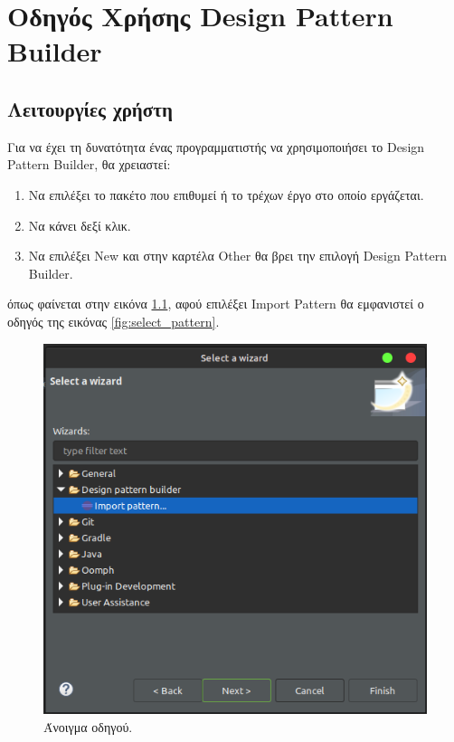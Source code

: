 \chapter{Οδηγός Χρήσης Design Pattern Builder}
\label{ch:manual}


\section{Λειτουργίες χρήστη}
\label{sec:manual}
Για να έχει τη δυνατότητα ένας προγραμματιστής να χρησιμοποιήσει το Design Pattern Builder, θα χρειαστεί:
\begin{enumerate}
    \item Να επιλέξει το πακέτο που επιθυμεί 
        ή το τρέχων έργο στο οποίο εργάζεται. 
    \item Να κάνει δεξί κλικ.
    \item Να επιλέξει New και στην καρτέλα 
        Other θα βρει την επιλογή Design Pattern Builder.
\end{enumerate} 
όπως φαίνεται στην εικόνα \ref{fig:open_wizard}, 
αφού επιλέξει Import Pattern θα εμφανιστεί ο οδηγός της εικόνας \ref{fig:select_pattern}.
\begin{figure}[H]
    \centering
    \includegraphics[width=1.0\textwidth]{Figures/open_wizard.png}
    \caption{Άνοιγμα οδηγού.}
    \label{fig:open_wizard}
\end{figure}
